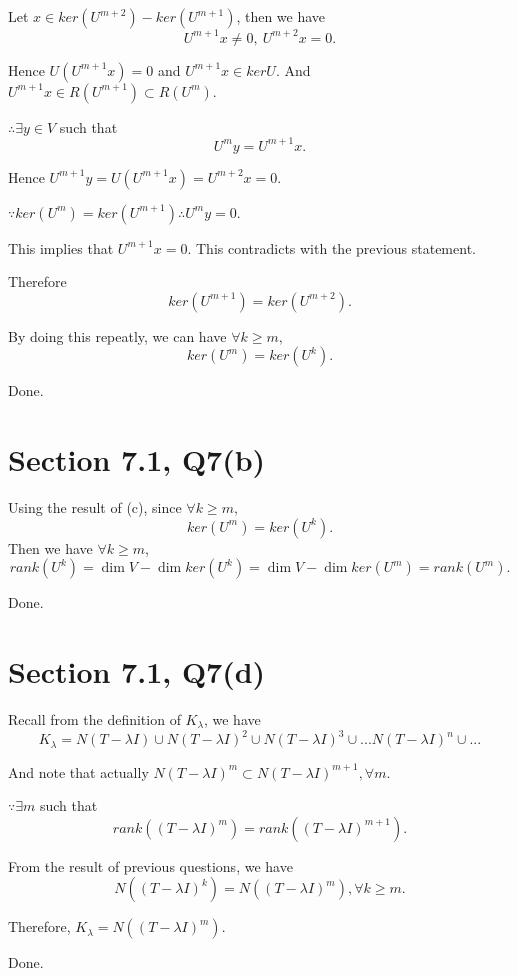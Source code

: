 \documentclass[12pt]{article}%
\begin{document}
Let $x \in ker(U^{m+2}) - ker(U^{m+1})$, then we have $$U^{m+1}x \neq 0,~ U^{m+2}x =0.$$

Hence $U(U^{m+1}x)=0$ and $U^{m+1}x \in ker U$. And $U^{m+1}x \in R(U^{m+1}) \subset R(U^{m}).$

$\therefore \exists y \in V$ such that $$U^{m}y=U^{m+1}x.$$

Hence $U^{m+1}y=U(U^{m+1}x)=U^{m+2}x=0.$

$\because ker(U^m)=ker(U^{m+1})  \therefore U^m y=0.$

This implies that $ U^{m+1}x=0. $ This contradicts with the previous statement.

Therefore $$ker(U^{m+1})=ker(U^{m+2}).$$

By doing this repeatly, we can have $\forall k\geq m,$ $$ker(U^m)=ker(U^k).$$

Done.

\section{Section 7.1, Q7(b)}

Using the result of (c), since $\forall k\geq m,$ $$ker(U^m)=ker(U^k).$$ Then we have $\forall k\geq m$, 
$$rank(U^k)=\dim V - \dim ker(U^k) = \dim V - \dim ker(U^m)=rank(U^m).$$

Done.

\section{Section 7.1, Q7(d)}

Recall from the definition of $K_{\lambda}$, we have $$K_{\lambda}=N(T-\lambda I) \cup N(T-\lambda I)^2 \cup N(T-\lambda I)^3 \cup ... N(T-\lambda I)^n \cup ...$$

And note that actually $N(T-\lambda I)^m \subset N(T-\lambda I)^{m+1}, \forall m.$

$\because \exists m$ such that $$rank((T-\lambda I)^m)=rank((T-\lambda I)^{m+1}).$$

From the result of previous questions, we have $$N((T-\lambda I)^k)=N((T-\lambda I)^m), \forall k\geq m.$$

Therefore, $K_{\lambda} =N((T-\lambda I)^m).$ 

Done.
\end{document}
